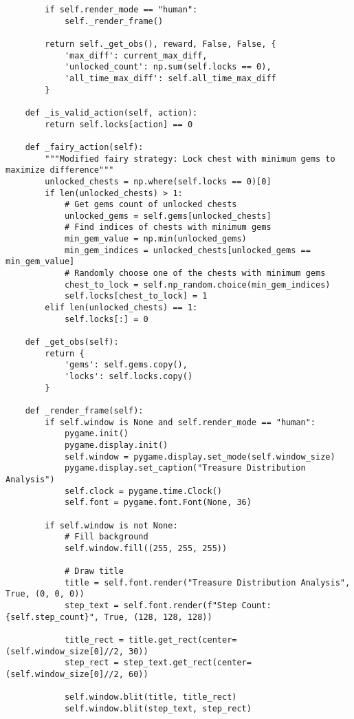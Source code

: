\begin{lstlisting}
        if self.render_mode == "human":
            self._render_frame()
        
        return self._get_obs(), reward, False, False, {
            'max_diff': current_max_diff,
            'unlocked_count': np.sum(self.locks == 0),
            'all_time_max_diff': self.all_time_max_diff
        }
    
    def _is_valid_action(self, action):
        return self.locks[action] == 0
    
    def _fairy_action(self):
        """Modified fairy strategy: Lock chest with minimum gems to maximize difference"""
        unlocked_chests = np.where(self.locks == 0)[0]
        if len(unlocked_chests) > 1:
            # Get gems count of unlocked chests
            unlocked_gems = self.gems[unlocked_chests]
            # Find indices of chests with minimum gems
            min_gem_value = np.min(unlocked_gems)
            min_gem_indices = unlocked_chests[unlocked_gems == min_gem_value]
            # Randomly choose one of the chests with minimum gems
            chest_to_lock = self.np_random.choice(min_gem_indices)
            self.locks[chest_to_lock] = 1
        elif len(unlocked_chests) == 1:
            self.locks[:] = 0
    
    def _get_obs(self):
        return {
            'gems': self.gems.copy(),
            'locks': self.locks.copy()
        }
    
    def _render_frame(self):
        if self.window is None and self.render_mode == "human":
            pygame.init()
            pygame.display.init()
            self.window = pygame.display.set_mode(self.window_size)
            pygame.display.set_caption("Treasure Distribution Analysis")
            self.clock = pygame.time.Clock()
            self.font = pygame.font.Font(None, 36)
        
        if self.window is not None:
            # Fill background
            self.window.fill((255, 255, 255))
            
            # Draw title
            title = self.font.render("Treasure Distribution Analysis", True, (0, 0, 0))
            step_text = self.font.render(f"Step Count: {self.step_count}", True, (128, 128, 128))
            
            title_rect = title.get_rect(center=(self.window_size[0]//2, 30))
            step_rect = step_text.get_rect(center=(self.window_size[0]//2, 60))
            
            self.window.blit(title, title_rect)
            self.window.blit(step_text, step_rect)
            

\end{lstlisting}
